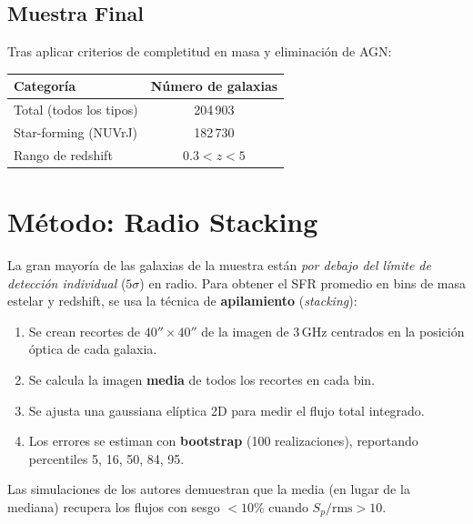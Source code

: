 \documentclass[12pt, a4paper]{article}
\begin{document}
\subsection{Muestra Final}
Tras aplicar criterios de completitud en masa y eliminación de AGN:

\begin{center}
\begin{tabular}{lc}
\toprule
\textbf{Categoría} & \textbf{Número de galaxias} \\
\midrule
Total (todos los tipos) & 204\,903 \\
Star-forming (NUVrJ) & 182\,730 \\
Rango de redshift & $0.3 < z < 5$ \\
\bottomrule
\end{tabular}
\end{center}

\section{Método: Radio Stacking}

La gran mayoría de las galaxias de la muestra están \textit{por debajo del límite
de detección individual} ($5\sigma$) en radio. Para obtener el SFR promedio en
bins de masa estelar y redshift, se usa la técnica de \textbf{apilamiento}
(\textit{stacking}):

\begin{enumerate}[leftmargin=2em]
    \item Se crean recortes de $40'' \times 40''$ de la imagen de 3\,GHz
          centrados en la posición óptica de cada galaxia.
    \item Se calcula la imagen \textbf{media} de todos los recortes en cada bin.
    \item Se ajusta una gaussiana elíptica 2D para medir el flujo total integrado.
    \item Los errores se estiman con \textbf{bootstrap} (100 realizaciones),
          reportando percentiles 5, 16, 50, 84, 95.
\end{enumerate}

Las simulaciones de los autores demuestran que la media (en lugar de la mediana)
recupera los flujos con sesgo $< 10\%$ cuando $S_p/\text{rms} > 10$.

\end{document}
